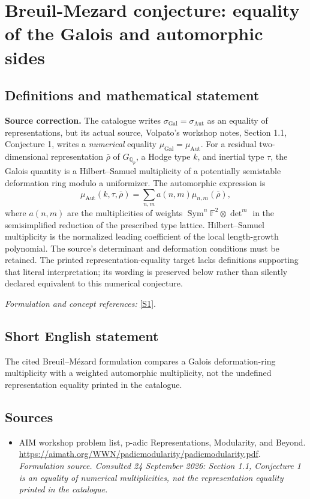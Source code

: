 \documentclass[11pt]{article}
\begin{document}
\section*{\texorpdfstring{Breuil-Mezard conjecture: equality of the Galois and automorphic sides}{Breuil-Mezard conjecture: equality of the Galois and automorphic sides}}\label{228}
\subsection{Definitions and mathematical statement}
\textbf{Source correction.} The catalogue writes $\sigma_{\mathrm{Gal}}=\sigma_{\mathrm{Aut}}$ as an equality of representations, but its actual source, Volpato's workshop notes, Section 1.1, Conjecture 1, writes a \emph{numerical} equality $\mu_{\mathrm{Gal}}=\mu_{\mathrm{Aut}}$. For a residual two-dimensional representation $\bar\rho$ of $G_{{\mathbb{Q}}_p}$, a Hodge type $k$, and inertial type $\tau$, the Galois quantity is a Hilbert--Samuel multiplicity of a potentially semistable deformation ring modulo a uniformizer. The automorphic expression is
\[
 \mu_{\mathrm{Aut}}(k,\tau,\bar\rho)=\sum_{n,m}a(n,m)\mu_{n,m}(\bar\rho),
\]
where $a(n,m)$ are the multiplicities of weights
$\operatorname{Sym}^n{\mathbb{F}}^2\otimes\det^m$ in the semisimplified reduction of the prescribed type lattice. Hilbert--Samuel multiplicity is the normalized leading coefficient of the local length-growth polynomial. The source's determinant and deformation conditions must be retained. The printed representation-equality target lacks definitions supporting that literal interpretation; its wording is preserved below rather than silently declared equivalent to this numerical conjecture.
\par\smallskip\textit{Formulation and concept references:} \href{https://aimath.org/WWN/padicmodularity/padicmodularity.pdf}{[S1]}.

\subsection{Short English statement}
The cited Breuil–Mézard formulation compares a Galois deformation-ring multiplicity with a weighted automorphic multiplicity, not the undefined representation equality printed in the catalogue.
\subsection{Sources}
\begin{itemize}
\item[S1]AIM workshop problem list, p-adic Representations, Modularity, and Beyond.
\url{https://aimath.org/WWN/padicmodularity/padicmodularity.pdf}.
\textit{Formulation source. Consulted 24 September 2026: Section 1.1, Conjecture 1 is an equality of numerical multiplicities, not the representation equality printed in the catalogue.}
\end{itemize}
\end{document}
